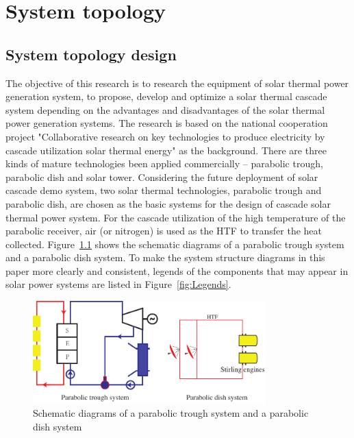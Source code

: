 \chapter{System topology}
\section{System topology design}
\label{sec:std}

The objective of this research is to research the equipment of solar thermal power generation system, to propose, develop and optimize a solar thermal cascade system depending on the advantages and disadvantages of the solar thermal power generation systems. 
The research is based on the national cooperation project "Collaborative research on key technologies to produce electricity by cascade utilization solar thermal energy" as the background. 
There are three kinds of mature technologies been applied commercially -- parabolic trough, parabolic dish and solar tower. 
Considering the future deployment of solar cascade demo system, two solar thermal technologies, parabolic trough and parabolic dish, are chosen as the basic systems for the design of cascade solar thermal power system. For the cascade utilization of the high temperature of the parabolic receiver, air (or nitrogen) is used as the HTF to transfer the heat collected.
Figure~\ref{fig:PTPD} shows the schematic diagrams of a parabolic trough system and a parabolic dish system. To make the system structure diagrams in this paper more clearly and consistent, legends of the components that may appear in solar power systems are listed in Figure~\ref{fig:Legends}.

\begin{figure}[!ht]
\centering
\includegraphics[width=0.8\textwidth]{fig/PTPD.pdf}
\caption{Schematic diagrams of a parabolic trough system and a parabolic dish system}\label{fig:PTPD}
\end{figure}

